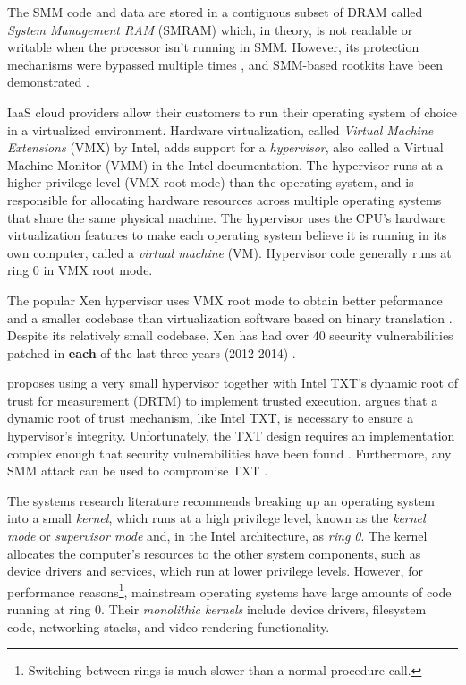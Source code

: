 The SMM code and data are stored in a contiguous subset of DRAM called
\textit{System Management RAM} (SMRAM) which, in theory, is not readable or
writable when the processor isn't running in SMM. However, its protection
mechanisms were bypassed multiple times \cite{duflot2006smm}
\cite{rutkowska2008remap} \cite{wojtczuk2009smm}, and SMM-based rootkits have
been demonstrated \cite{wecherowski2009smm} \cite{embleton2010smm}.

IaaS cloud providers allow their customers to run their operating system of
choice in a virtualized environment. Hardware
virtualization\cite{uhlig2005vmx}, called \textit{Virtual Machine Extensions}
(VMX) by Intel, adds support for a \textit{hypervisor}, also called a
Virtual Machine Monitor (VMM) in the Intel documentation. The hypervisor runs
at a higher privilege level (VMX root mode) than the operating system, and is
responsible for allocating hardware resources across multiple operating systems
that share the same physical machine. The hypervisor uses the CPU's hardware
virtualization features to make each operating system believe it is running in
its own computer, called a \textit{virtual machine} (VM). Hypervisor code
generally runs at ring 0 in VMX root mode.

The popular Xen hypervisor uses VMX root mode to obtain better peformance and a
smaller codebase \cite{zhang2008xen} than virtualization software based on
binary translation \cite{rosenblum2005virtualization}. Despite its relatively
small codebase, Xen has had over 40 security vulnerabilities patched in
\textbf{each} of the last three years (2012-2014) \cite{cvedetails2014xen}.

\cite{mccune2010trustvisor} proposes using a very small hypervisor together
with Intel TXT's dynamic root of trust for measurement (DRTM) to implement
trusted execution. \cite{vasudevan2010requirements} argues that a dynamic root
of trust mechanism, like Intel TXT, is necessary to ensure a hypervisor's
integrity.  Unfortunately, the TXT design requires an implementation complex
enough that security vulnerabilities have been found \cite{wojtczuk2009txt2}
\cite{wojtczuk2011txt}. Furthermore, any SMM attack can be used to compromise
TXT \cite{wojtczuk2009txt}.

The systems research literature recommends breaking up an operating system into
a small \textit{kernel}, which runs at a high privilege level, known as the
\textit{kernel mode} or \textit{supervisor mode} and, in the Intel
architecture, as \textit{ring 0}. The kernel allocates the computer's resources
to the other system components, such as device drivers and services, which run
at lower privilege levels. However, for performance reasons\footnote{Switching
between rings is much slower than a normal procedure call.}, mainstream
operating systems have large amounts of code running at ring 0. Their
\textit{monolithic kernels} include device drivers, filesystem code, networking
stacks, and video rendering functionality.

